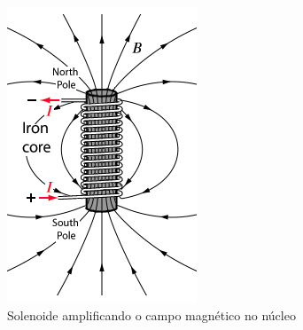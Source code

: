 \documentclass[
        12pt,                           %
        openright,                      %
        twoside,                        %
        a4paper,                        %
        english,                        %
        french,                         %
        spanish,                        %
        brazil                          %
        ]{abntex2}
\begin{document}
\begin{figure}[htp]
  \centering
  \includegraphics[width=0.2\columnwidth]{Elecmagnet.png}
  \caption{Solenoide amplificando o campo magnético no núcleo}
  \label{fig:chap:embasamento:6}
\end{figure}


\end{document}
